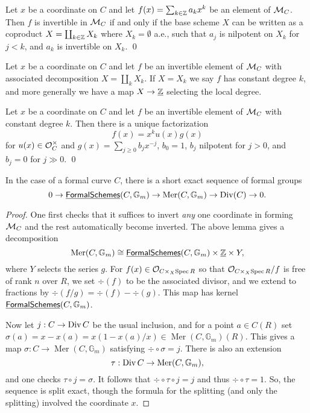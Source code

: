 \begin{lemma}
Let $x$ be a coordinate on $C$ and let $f(x) = \sum_{k \in \mathbb Z} a_k x^k$ be an element of $\mathcal{M}_C$.  Then $f$ is invertible in $\mathcal{M}_C$ if and only if the base scheme $X$ can be written as a coproduct $X = \coprod_{k \in \mathbb Z} X_k$ where $X_k = \emptyset$ a.e., such that $a_j$ is nilpotent on $X_k$ for $j < k$, and $a_k$ is invertible on $X_k$. \qed
\end{lemma}

\begin{definition}
Let $x$ be a coordinate on $C$ and let $f$ be an invertible element of $\mathcal{M}_C$ with associated decomposition $X = \coprod_k X_k$.  If $X = X_k$ we say $f$ has constant degree $k$, and more generally we have a map $X \to \underline{\mathbb Z}$ selecting the local degree.
\end{definition}

\begin{lemma}
Let $x$ be a coordinate on $C$ and let $f$ be an invertible element of $\mathcal{M}_C$ with constant degree $k$.  Then there is a unique factorization \[f(x) = x^k u(x) g(x)\] for $u(x) \in \mathcal{O}_C^\times$ and $g(x) = \sum_{j \ge 0} b_j x^{-j}$, $b_0 = 1$, $b_j$ nilpotent for $j > 0$, and $b_j = 0$ for $j \gg 0$. \qed
\end{lemma}

\begin{lemma}
In the case of a formal curve $C$, there is a short exact sequence of formal groups \[0 \to \operatorname{\underline{\smash{\mathsf{FormalSchemes}}}}(C, \mathbb G_m) \to \operatorname{Mer}(C, \mathbb G_m) \to \operatorname{Div}(C) \to 0.\]
\end{lemma}
\begin{proof}
One first checks that it suffices to invert \emph{any} one coordinate in forming $\mathcal{M}_C$ and the rest automatically become inverted.  The above lemma gives a decomposition \[\operatorname{Mer}(C, \mathbb G_m) \cong \operatorname{\underline{\smash{\mathsf{FormalSchemes}}}}(C, \mathbb G_m) \times \underline{\mathbb Z} \times Y,\] where $Y$ selects the series $g$.  For $f(x) \in \mathcal{O}_{C \times_X \operatorname{Spec} R}$ so that $\mathcal{O}_{C \times_X \operatorname{Spec} R} / f$ is free of rank $n$ over $R$, we set $\div(f)$ to be the associated divisor, and we extend to fractions by $\div(f/g) = \div(f) - \div(g)$.  This map has kernel $\operatorname{\underline{\smash{\mathsf{FormalSchemes}}}}(C, \mathbb G_m)$.

Now let $j: C \to \operatorname{Div} C$ be the usual inclusion, and for a point $a \in C(R)$ set $\sigma(a) = x - x(a) = x(1 - x(a)/x) \in \operatorname{Mer}(C, \mathbb G_m)(R)$.  This gives a map $\sigma: C \to \operatorname{Mer}(C, \mathbb G_m)$ satisfying $\div \circ \sigma = j$.  There is also an extension \[ \tau: \operatorname{Div} C \to \operatorname{Mer}(C, \mathbb G_m),\] and one checks $\tau \circ j = \sigma$.  It follows that $\div \circ \tau \circ j = j$ and thus $\div \circ \tau = 1$.  So, the sequence is split exact, though the formula for the splitting (and only the splitting) involved the coordinate $x$.
\end{proof}

